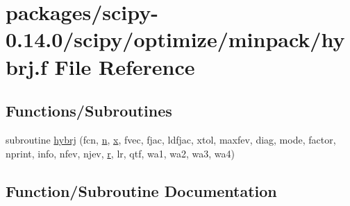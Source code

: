 \hypertarget{hybrj_8f}{}\section{packages/scipy-\/0.14.0/scipy/optimize/minpack/hybrj.f File Reference}
\label{hybrj_8f}
\subsection*{Functions/\+Subroutines}
\begin{DoxyCompactItemize}
\item 
subroutine \hyperlink{hybrj_8f_a0bf4eb480c70afa546fd97c13fbc1f5f}{hybrj} (fcn, \hyperlink{indexexpr_8h_ab427e2e2b4d6cec55fa088ea2a692ace}{n}, \hyperlink{vecnorm1_8cc_ac73eed9e41ec09d58f112f06c2d6cb63}{x}, fvec, fjac, ldfjac, xtol, maxfev, diag, mode, factor, nprint, info, nfev, njev, \hyperlink{indexexpr_8h_ac434fd11cc2493608d8d91424d60c17e}{r}, lr, qtf, wa1, wa2, wa3, wa4)
\end{DoxyCompactItemize}


\subsection{Function/\+Subroutine Documentation}
\hypertarget{hybrj_8f_a0bf4eb480c70afa546fd97c13fbc1f5f}{}
